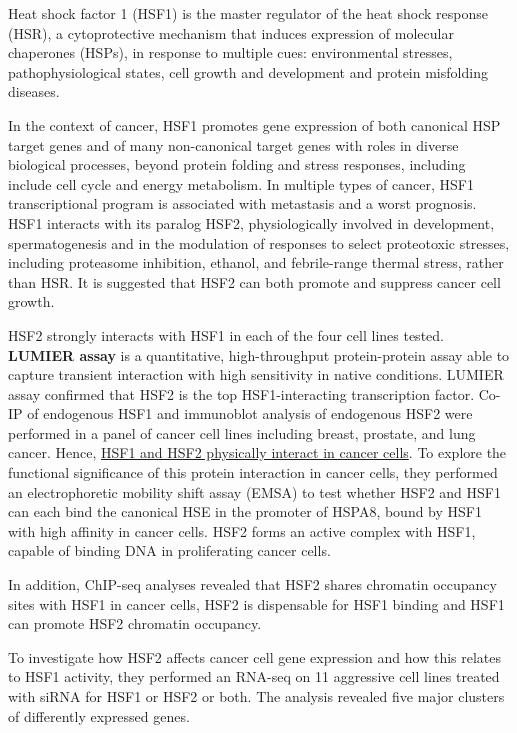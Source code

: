 Heat shock factor 1 (HSF1) is the master regulator of the heat shock response (HSR), a cytoprotective mechanism that induces expression of
molecular chaperones (HSPs), in response to multiple cues: environmental stresses, pathophysiological states, cell growth and development and
protein misfolding diseases.

In the context of cancer, HSF1 promotes gene expression of both canonical HSP target genes and of many non-canonical target genes with roles in diverse biological processes, beyond protein folding and stress responses, including include cell cycle and energy metabolism. In multiple types of cancer, HSF1 transcriptional program is associated with metastasis and a worst prognosis. HSF1 interacts with its paralog HSF2, physiologically involved in development, spermatogenesis and in the modulation of responses to select proteotoxic stresses, including proteasome inhibition, ethanol, and febrile-range thermal stress, rather than HSR. It is suggested that HSF2 can both promote and suppress cancer cell growth.

HSF2 strongly interacts with HSF1 in each of the four cell lines tested. \textbf{LUMIER assay} is a quantitative, high-throughput protein-protein assay able to capture transient interaction with high sensitivity in native conditions. LUMIER assay confirmed that HSF2 is the top HSF1-interacting transcription factor. Co-IP of endogenous HSF1 and immunoblot analysis of endogenous HSF2 were performed in a panel of cancer cell lines including breast, prostate, and lung cancer. Hence, \underline{HSF1 and HSF2 physically interact in cancer cells}. To explore the functional significance of this protein interaction in cancer cells, they performed an electrophoretic mobility shift assay (EMSA) to test whether HSF2 and HSF1 can each bind the canonical HSE in the promoter of HSPA8, bound by HSF1 with high affinity in cancer cells. HSF2 forms an active complex with HSF1, capable of binding DNA in proliferating cancer cells.

In addition, ChIP-seq analyses revealed that HSF2 shares chromatin occupancy sites with HSF1 in cancer cells, HSF2 is dispensable for HSF1 binding and HSF1 can promote HSF2 chromatin occupancy.

To investigate how HSF2 affects cancer cell gene expression and how this relates to HSF1 activity, they performed an RNA-seq on 11 aggressive cell lines treated with siRNA for HSF1 or HSF2 or both. The analysis revealed five major clusters of differently expressed genes.

